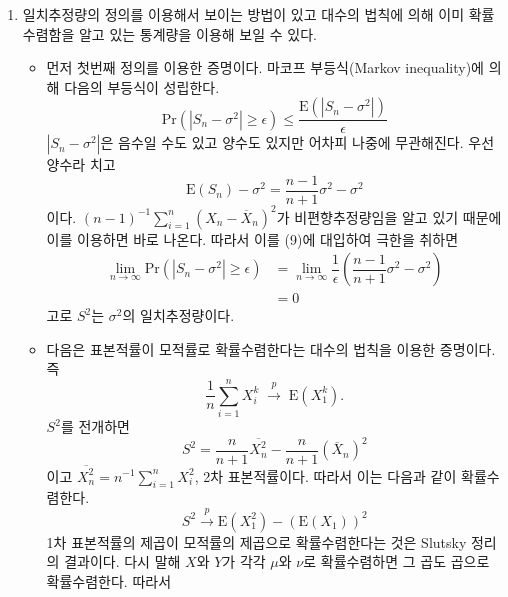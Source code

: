 \documentclass[answers]{exam}
\begin{document}
\begin{questions}
\begin{solution}
\begin{enumerate}
      \item 일치추정량의 정의를 이용해서 보이는 방법이 있고 대수의 법칙에 의해 이미 확률수렴함을 알고 있는 통계량을 이용해 보일 수 있다. 
      \begin{itemize}
      \item 먼저 첫번째 정의를 이용한 증명이다. 마코프 부등식(Markov inequality)에 의해 다음의 부등식이 성립한다.
      \begin{equation}
        \mathrm{Pr}\left(\left|S_{n}-\sigma^{2}\right|\geq \epsilon\right) \leq \dfrac{\mathrm{E}\left(\left|S_{n}-\sigma^{2}\right|\right)}{\epsilon}
      \end{equation}
      $\left|S_{n}-\sigma^{2}\right|$은 음수일 수도 있고 양수도 있지만 어차피 나중에 무관해진다. 우선 양수라 치고 
      \begin{equation}
        \mathrm{E}\left(S_{n}\right)-\sigma^{2} = \dfrac{n-1}{n+1}\sigma^{2}-\sigma^{2}
      \end{equation}
      이다. $\left(n-1\right)^{-1}\sum_{i=1}^{n}\left(X_{n}-\overline{X}_{n}\right)^{2}$가 비편향추정량임을 알고 있기 때문에 이를 이용하면 바로 나온다. 따라서 이를 (9)에 대입하여 극한을 취하면
      \begin{align}
        \lim_{n\to\infty}\mathrm{Pr}\left(\left|S_{n}-\sigma^{2}\right|\geq \epsilon\right) &= \lim_{n\to\infty}\dfrac{1}{\epsilon}\left(\dfrac{n-1}{n+1}\sigma^{2}-\sigma^{2}\right)\\
        &= 0
      \end{align}
      고로 $S^{2}$는 $\sigma^{2}$의 일치추정량이다.
      \item 다음은 표본적률이 모적률로 확률수렴한다는 대수의 법칙을 이용한 증명이다. 즉
      \begin{equation}
        \dfrac{1}{n}\sum_{i=1}^{n}X_{i}^{k}\; \xrightarrow{p} \; \mathrm{E}\left(X_{1}^{k}\right).
      \end{equation}
      $S^{2}$를 전개하면
      \begin{equation}
        S^{2} = \dfrac{n}{n+1}\overline{X^{2}_{n}}-\dfrac{n}{n+1}\left(\overline{X}_{n}\right)^{2}
      \end{equation}
      이고 $\overline{X^{2}_{n}}=n^{-1}\sum_{i=1}^{n}X_{i}^{2}$, 2차 표본적률이다. 따라서 이는 다음과 같이 확률수렴한다.
      \begin{equation}
        S^{2} \xrightarrow{p} \mathrm{E}\left(X_{1}^{2}\right) - \left(\mathrm{E}\left(X_{1}\right)\right)^{2}
      \end{equation}
      1차 표본적률의 제곱이 모적률의 제곱으로 확률수렴한다는 것은 Slutsky 정리의 결과이다. 다시 말해 $X$와 $Y$가 각각 $\mu$와 $\nu$로 확률수렴하면 그 곱도 곱으로 확률수렴한다. 따라서

\end{itemize}
\end{enumerate}
\end{solution}
\end{questions}
\end{document}
